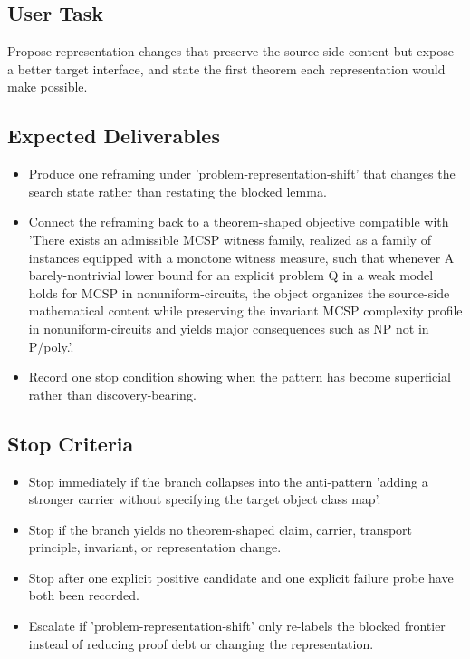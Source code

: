 \documentclass[11pt]{article}
\begin{document}
\subsection*{User Task}
Propose representation changes that preserve the source-side content but expose a better target interface, and state the first theorem each representation would make possible.

\subsection*{Expected Deliverables}
\begin{itemize}[leftmargin=*,itemsep=0.2em]
\item Produce one reframing under 'problem-representation-shift' that changes the search state rather than restating the blocked lemma.
\item Connect the reframing back to a theorem-shaped objective compatible with 'There exists an admissible MCSP witness family, realized as a family of instances equipped with a monotone witness measure, such that whenever A barely-nontrivial lower bound for an explicit problem Q in a weak model holds for MCSP in nonuniform-circuits, the object organizes the source-side mathematical content while preserving the invariant MCSP complexity profile in nonuniform-circuits and yields major consequences such as NP not in P/poly.'.
\item Record one stop condition showing when the pattern has become superficial rather than discovery-bearing.
\end{itemize}
\subsection*{Stop Criteria}
\begin{itemize}[leftmargin=*,itemsep=0.2em]
\item Stop immediately if the branch collapses into the anti-pattern 'adding a stronger carrier without specifying the target object class map'.
\item Stop if the branch yields no theorem-shaped claim, carrier, transport principle, invariant, or representation change.
\item Stop after one explicit positive candidate and one explicit failure probe have both been recorded.
\item Escalate if 'problem-representation-shift' only re-labels the blocked frontier instead of reducing proof debt or changing the representation.
\end{itemize}
\end{document}
